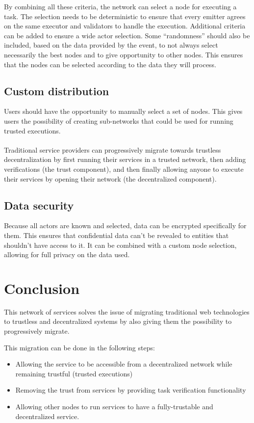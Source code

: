 \documentclass[12pt,a4paper,final]{article}
\begin{document}
By combining all these criteria, the network can select a node for executing a task. The selection needs to be deterministic to ensure that every emitter agrees on the same executor and validators to handle the execution. Additional criteria can be added to ensure a wide actor selection. Some “randomness” should also be included, based on the data provided by the event, to not always select necessarily the best nodes and to give opportunity to other nodes. This ensures that the nodes can be selected according to the data they will process.

\subsection{Custom distribution}

Users should have the opportunity to manually select a set of nodes. This gives users the possibility of creating sub-networks that could be used for running trusted executions.
\\\\
Traditional service providers can progressively migrate towards trustless decentralization by first running their services in a trusted network, then adding verifications (the trust component), and then finally allowing anyone to execute their services by opening their network (the decentralized component).

\subsection{Data security}

Because all actors are known and selected, data can be encrypted specifically for them. This ensures that confidential data can’t be revealed to entities that shouldn’t have access to it. It can be combined with a custom node selection, allowing for full privacy on the data used.

\section{Conclusion}

This network of services solves the issue of migrating traditional web technologies to trustless and decentralized systems by also giving them the possibility to progressively migrate.

This migration can be done in the following steps:

\begin{itemize}
\item Allowing the service to be accessible from a decentralized network while remaining trustful (trusted executions)
\item Removing the trust from services by providing task verification functionality
\item Allowing other nodes to run services to have a fully-trustable and decentralized service.
\end{itemize}
\end{document}
